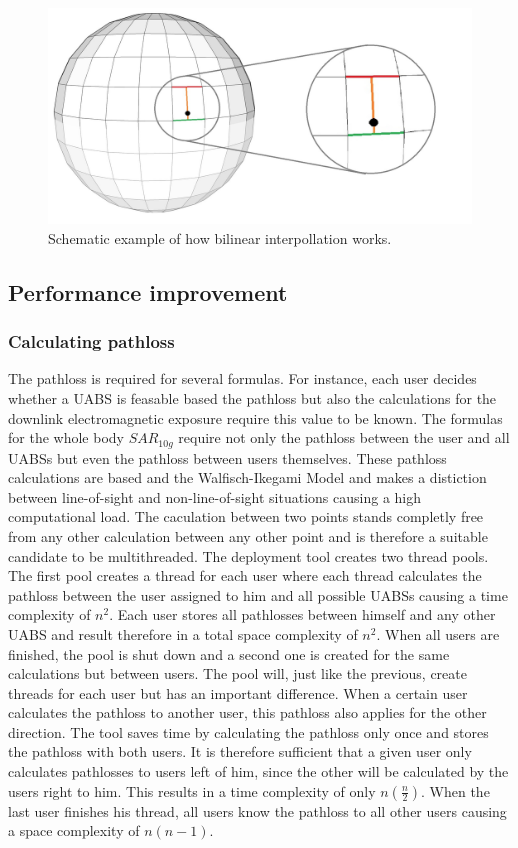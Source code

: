 \begin{figure}[H]
\centering
  \includegraphics[width=\textwidth/3*2]{../images/3Dimages/globev2.jpg}
  \caption{Schematic example of how bilinear interpollation works.}
  \label{fig:globe}
\end{figure}

\subsection{Performance improvement}
\subsubsection{Calculating pathloss}
The pathloss is required for several formulas. For instance, each user decides whether a \gls{UABS} is feasable based 
the pathloss but also the calculations for the downlink electromagnetic 
exposure require this value to be known. The formulas for the whole body $SAR_{10g}$ require not only the pathloss between the user
and all \gls{UABS}s but even the pathloss between users themselves. These pathloss calculations are based and the Walfisch-Ikegami 
Model and makes a distiction between line-of-sight and non-line-of-sight situations causing a high computational load. The caculation between two points stands completly free from
any other calculation between any other point and is therefore a suitable candidate to be multithreaded. The deployment tool creates two thread pools.
The first pool creates a thread for each user where each thread calculates the pathloss between the user assigned to him and all possible \gls{UABS}s causing a time complexity of $n^2$.
Each user stores all pathlosses between himself and any other \gls{UABS} and result therefore in a total space complexity of $n^2$.
When all users are finished, the pool is shut down and a second one is created for the same calculations but between users.
The pool will, just like the previous, create threads for each user but has an important difference.
When a certain user calculates the pathloss to another user, this pathloss also applies for the other direction. The tool saves time by calculating the pathloss only 
once and stores the pathloss with both users. It is therefore sufficient that a given user only calculates pathlosses to users left of him, since the other will 
be calculated by the users right to him. This results in a time complexity of only $n(\frac{n}{2})$. When the last user finishes his thread, all users know the pathloss to all other users causing 
a space complexity of $n(n-1)$.

